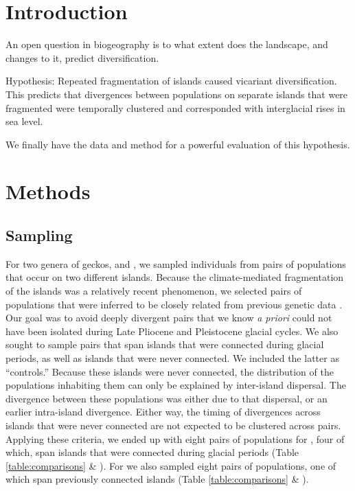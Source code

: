 \section{Introduction}

An open question in biogeography is to what extent does the landscape, and
changes to it, predict diversification.

Hypothesis: Repeated fragmentation of islands caused vicariant diversification.
This predicts that divergences between populations on separate islands that
were fragmented were temporally clustered and corresponded with interglacial
rises in sea level.

We finally have the data and method for a powerful evaluation of this
hypothesis.


\section{Methods}

\subsection{Sampling}
For two genera of geckos,  and , we sampled
individuals from pairs of populations that occur on two different islands.
Because the climate-mediated fragmentation of the islands was a relatively
recent phenomenon, we selected pairs of populations that were inferred to be
closely related from previous genetic data \citep{Siler2012, Siler2014kikuchii,
    Welton2010, Welton2010zootaxa, Siler2010}.
Our goal was to avoid deeply divergent pairs that we know \emph{a priori} could
not have been isolated during Late Pliocene and Pleistocene glacial cycles.
We also sought to sample pairs that span islands that were connected during
glacial periods, as well as islands that were never connected.
We included the latter as ``controls.''
Because these islands were never connected, the distribution of the populations
inhabiting them can only be explained by inter-island dispersal.
The divergence between these populations was either due to that
dispersal, or an earlier intra-island divergence.
Either way, the timing of divergences across islands that were never connected
are not expected to be clustered across pairs.
Applying these criteria, we ended up with eight pairs of populations for
, four of which, span islands that were connected during
glacial periods (Table \ref{table:comparisons} \& ).
For  we also sampled eight pairs of populations, one of which span
previously connected islands (Table \ref{table:comparisons} \& ).


